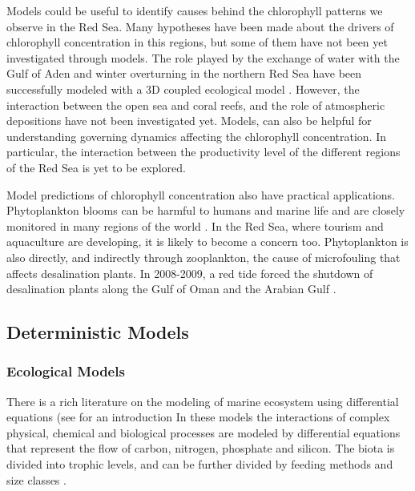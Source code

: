 Models could be useful to identify causes behind the chlorophyll patterns we
observe in the Red Sea. Many hypotheses have been made about the drivers of
chlorophyll concentration in this regions, but some of them have not been yet
investigated through models. The role played by the exchange of water with the
Gulf of Aden and winter overturning in the northern Red Sea have been
successfully modeled with a 3D coupled ecological model
\citep{Triantafyllou2014}. However, the interaction between the open sea and
coral reefs, and the role of atmospheric depositions have not been investigated
yet. Models, can also be helpful for understanding governing dynamics affecting
the chlorophyll concentration. In particular, the interaction between the
productivity level of the different regions of the Red Sea is yet to be
explored.

Model predictions of chlorophyll concentration also have practical
applications. Phytoplankton blooms can be harmful to humans and marine life and
are closely monitored in many regions of the world \citep{Pettersson2013}. In
the Red Sea, where tourism and aquaculture are developing, it is likely to
become a concern too. Phytoplankton is also directly, and indirectly through
zooplankton, the cause of microfouling that affects desalination plants. In
2008-2009, a red tide forced the shutdown of desalination plants along the Gulf
of Oman and the Arabian Gulf \citep{Richlen2010}.


\subsection{Deterministic Models}

\subsubsection{Ecological Models}

There is a rich literature on the modeling of marine ecosystem using
differential equations (see \citet{Fennel2004} for an introduction In these
models the interactions of complex physical, chemical and biological processes
are modeled by differential equations that represent the flow of carbon,
nitrogen, phosphate and silicon. The biota is divided into trophic levels, and
can be further divided by feeding methods and size classes
\citep{Triantafyllou2014}.

